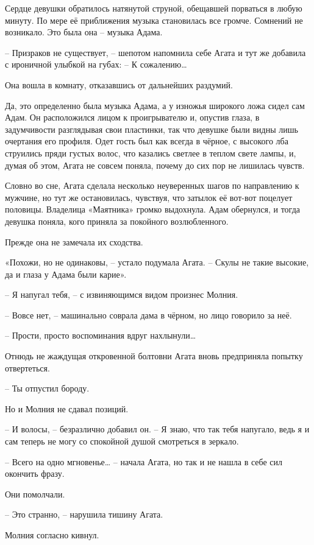 \documentclass[
  a5paperpaper,
  DIV=11,
  numbers=noendperiod]{scrreprt}
\begin{document}
Сердце девушки обратилось натянутой струной, обещавшей порваться в любую
минуту. По мере её приближения музыка становилась все громче. Сомнений
не возникало. Это была она -- музыка Адама.

-- Призраков не существует, -- шепотом напомнила себе Агата и тут же
добавила с ироничной улыбкой на губах: -- К сожалению\ldots{}

Она вошла в комнату, отказавшись от дальнейших раздумий.

Да, это определенно была музыка Адама, а у изножья широкого ложа сидел
сам Адам. Он расположился лицом к проигрывателю и, опустив глаза, в
задумчивости разглядывая свои пластинки, так что девушке были видны лишь
очертания его профиля. Одет гость был как всегда в чёрное, с высокого
лба струились пряди густых волос, что казались светлее в теплом свете
лампы, и, думая об этом, Агата не совсем поняла, почему до сих пор не
лишилась чувств.

Словно во сне, Агата сделала несколько неуверенных шагов по направлению
к мужчине, но тут же остановилась, чувствуя, что затылок её вот-вот
поцелует половицы. Владелица «Маятника» громко выдохнула. Адам
обернулся, и тогда девушка поняла, кого приняла за покойного
возлюбленного.

Прежде она не замечала их сходства.

«Похожи, но не одинаковы, -- устало подумала Агата. -- Скулы не такие
высокие, да и глаза у Адама были карие».

-- Я напугал тебя, -- с извиняющимся видом произнес Молния.

-- Вовсе нет, -- машинально соврала дама в чёрном, но лицо говорило за
неё.

-- Прости, просто воспоминания вдруг нахлынули\ldots{}

Отнюдь не жаждущая откровенной болтовни Агата вновь предприняла попытку
отвертеться.

-- Ты отпустил бороду.

Но и Молния не сдавал позиций.

-- И волосы, -- безразлично добавил он. -- Я знаю, что так тебя
напугало, ведь я и сам теперь не могу со спокойной душой смотреться в
зеркало.

-- Всего на одно мгновенье\ldots{} -- начала Агата, но так и не нашла в
себе сил окончить фразу.

Они помолчали.

-- Это странно, -- нарушила тишину Агата.

Молния согласно кивнул.
\end{document}
